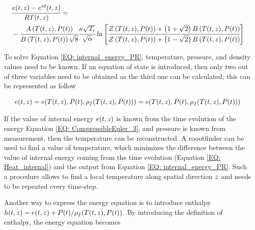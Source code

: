 \documentclass[../Article_Model_Parameters.tex]{subfiles}
\begin{document}
			{\scriptsize
				\begin{equation}
					\begin{aligned}
					&\cfrac{{\color{black}e}(t,z)-{\color{black}e}^{id}(t,z)}{R{\color{black}T}(t,z)} = \\
					& - \cfrac{{\color{black}A}\left({\color{black}T}(t,z), {\color{black}P}(t)\right)}{{\color{black}B}\left({\color{black}T}(t,z), {\color{black}P}(t)\right)\sqrt{8}} \cfrac{{\color{black}\kappa} \sqrt{\color{black}T_r}}{\sqrt{\alpha}} \ln \left[ \cfrac{{\color{black}Z}\left({\color{black}T}(t,z), {\color{black}P}(t)\right)+\left( 1+\sqrt{2} \right){\color{black}B}\left({\color{black}T}(t,z), {\color{black}P}(t)\right)}{{\color{black}Z}\left({\color{black}T}(t,z), {\color{black}P}(t)\right)+\left( 1-\sqrt{2} \right){\color{black}B}\left({\color{black}T}(t,z), {\color{black}P}(t)\right)} \right]
					\label{EQ: internal_energy_PR}
				\end{aligned}
			\end{equation}
			}
			
			To solve Equation \ref{EQ: internal_energy_PR}, temperature, pressure, and density values need to be known. If an equation of state is introduced, then only two out of three variables need to be obtained as the third one can be calculated; this can be represented as follow
			
			{\footnotesize
			\begin{equation}
				{\color{black}e}(t,z)={\color{black}e}({\color{black}T}(t,z),{\color{black}P}(t),{\color{black}\rho_f}({\color{black}T}(t,z),{\color{black}P}(t)))=e( {\color{black}T}(t,z),{\color{black}P}(t), {\color{black}\rho_f}({\color{black}T}(t,z),{\color{black}P}(t)) ) 
			\end{equation}
			}
		
			If the value of internal energy ${\color{black}e}(t,z)$ is known from the time evolution of the energy Equation \ref{EQ: CompressibleEuler_3}, and pressure is known from measurement, then the temperature can be reconstructed. A roootfinder can be used to find a value of temperature, which minimizes the difference between the value of internal energy coming from the time evolution (Equation \ref{EQ: Heat_internal}) and the output from Equation \ref{EQ: internal_energy_PR}. Such a procedure allows to find a local temperature along spatial direction ${\color{black}z}$ and needs to be repeated every time-step.
		
			Another way to express the energy equation is to introduce enthalpy ${\color{black}h}(t,z) = {\color{black}e}(t,z) + {\color{black}P}(t) / {\color{black}\rho_f}({\color{black}T}(t,z),{\color{black}P}(t))$. By introducing the definition of enthalpy, the energy equation becomes
			
\end{document}
